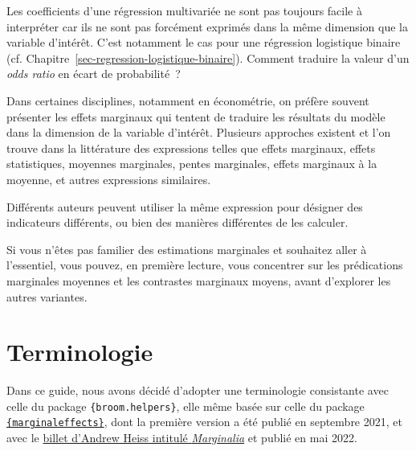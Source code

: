 \documentclass[
  letterpaper,
  DIV=11,
  numbers=noendperiod,
  oneside]{scrreprt}
\begin{document}
Les coefficients d'une régression multivariée ne sont pas toujours
facile à interpréter car ils ne sont pas forcément exprimés dans la même
dimension que la variable d'intérêt. C'est notamment le cas pour une
régression logistique binaire (cf.
Chapitre~\ref{sec-regression-logistique-binaire}). Comment traduire la
valeur d'un \emph{odds ratio} en écart de probabilité~?

Dans certaines disciplines, notamment en économétrie, on préfère souvent
présenter les effets marginaux qui tentent de traduire les résultats du
modèle dans la dimension de la variable d'intérêt. Plusieurs approches
existent et l'on trouve dans la littérature des expressions telles que
effets marginaux, effets statistiques, moyennes marginales, pentes
marginales, effets marginaux à la moyenne, et autres expressions
similaires.

Différents auteurs peuvent utiliser la même expression pour désigner des
indicateurs différents, ou bien des manières différentes de les
calculer.

\begin{tcolorbox}[enhanced jigsaw, colbacktitle=quarto-callout-note-color!10!white, opacityback=0, toprule=.15mm, colback=white, coltitle=black, bottomtitle=1mm, toptitle=1mm, titlerule=0mm, rightrule=.15mm, title=\textcolor{quarto-callout-note-color}{\faInfo}\hspace{0.5em}{Note}, breakable, bottomrule=.15mm, opacitybacktitle=0.6, arc=.35mm, left=2mm, leftrule=.75mm, colframe=quarto-callout-note-color-frame]

Si vous n'êtes pas familier des estimations marginales et souhaitez
aller à l'essentiel, vous pouvez, en première lecture, vous concentrer
sur les prédications marginales moyennes et les contrastes marginaux
moyens, avant d'explorer les autres variantes.

\end{tcolorbox}

\hypertarget{terminologie}{%
\section{Terminologie}\label{terminologie}}

Dans ce guide, nous avons décidé d'adopter une terminologie consistante
avec celle du package \texttt{\{broom.helpers\}}, elle même basée sur
celle du package
\href{https://vincentarelbundock.github.io/marginaleffects/\#definitions}{\texttt{\{marginaleffects\}}},
dont la première version a été publié en septembre 2021, et avec le
\href{https://www.andrewheiss.com/blog/2022/05/20/marginalia/}{billet
d'Andrew Heiss intitulé \emph{Marginalia}} et publié en mai 2022.
\end{document}
